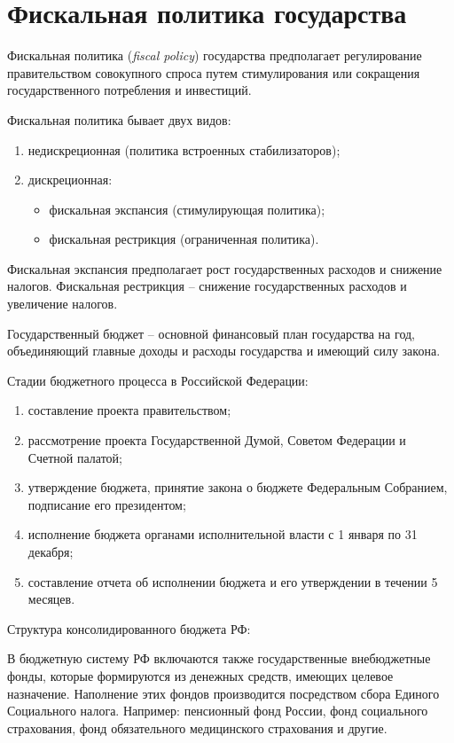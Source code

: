 \section{Фискальная политика государства} %

Фискальная политика (\emph{fiscal policy}) государства предполагает
регулирование правительством совокупного спроса путем стимулирования или
сокращения государственного потребления и инвестиций.

Фискальная политика бывает двух видов:
\begin{enumerate}
    \item недискреционная (политика встроенных стабилизаторов);
    \item дискреционная:
    \begin{itemize}
        \item фискальная экспансия (стимулирующая политика);
        \item фискальная рестрикция (ограниченная политика).
    \end{itemize}
\end{enumerate}

Фискальная экспансия предполагает рост государственных расходов и снижение
налогов.
Фискальная рестрикция -- снижение государственных расходов и увеличение
налогов.

Государственный бюджет -- основной финансовый план государства на год,
объединяющий главные доходы и расходы государства и имеющий силу закона.

Стадии бюджетного процесса в Российской Федерации:
\begin{enumerate}
    \item составление проекта правительством;
    \item рассмотрение проекта Государственной Думой, Советом Федерации и
    Счетной палатой;
    \item утверждение бюджета, принятие закона о бюджете Федеральным Собранием,
    подписание его президентом;
    \item исполнение бюджета органами исполнительной власти с 1 января по 31
    декабря;
    \item составление отчета об исполнении бюджета и его утверждении в течении
    5 месяцев.
\end{enumerate}

Структура консолидированного бюджета РФ:

В бюджетную систему РФ включаются также государственные внебюджетные фонды,
которые формируются из денежных средств, имеющих целевое назначение. Наполнение
этих фондов производится посредством сбора Единого Социального налога.
Например: пенсионный фонд России, фонд социального страхования, фонд
обязательного медицинского страхования и другие.

